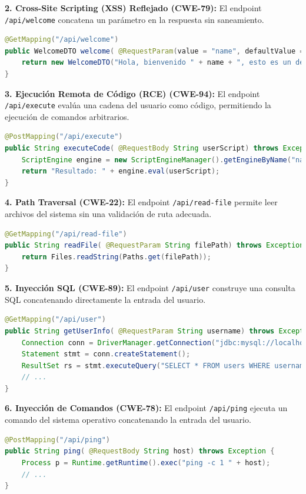 \textbf{2. Cross-Site Scripting (XSS) Reflejado (CWE-79):} El endpoint \texttt{/api/welcome} concatena un parámetro en la respuesta sin saneamiento.
\begin{lstlisting}[language=java, caption={Código vulnerable a XSS.}]
@GetMapping("/api/welcome")
public WelcomeDTO welcome( @RequestParam(value = "name", defaultValue = "...") String name) {
    return new WelcomeDTO("Hola, bienvenido " + name + ", esto es un demo");
}
\end{lstlisting}

\textbf{3. Ejecución Remota de Código (RCE) (CWE-94):} El endpoint \texttt{/api/execute} evalúa una cadena del usuario como código, permitiendo la ejecución de comandos arbitrarios.
\begin{lstlisting}[language=java, caption={Código vulnerable a RCE.}]
@PostMapping("/api/execute")
public String executeCode( @RequestBody String userScript) throws Exception {
    ScriptEngine engine = new ScriptEngineManager().getEngineByName("nashorn");
    return "Resultado: " + engine.eval(userScript);
}
\end{lstlisting}

\textbf{4. Path Traversal (CWE-22):} El endpoint \texttt{/api/read-file} permite leer archivos del sistema sin una validación de ruta adecuada.
\begin{lstlisting}[language=java, caption={Código vulnerable a Path Traversal.}]
@GetMapping("/api/read-file")
public String readFile( @RequestParam String filePath) throws Exception {
    return Files.readString(Paths.get(filePath));
}
\end{lstlisting}

\textbf{5. Inyección SQL (CWE-89):} El endpoint \texttt{/api/user} construye una consulta SQL concatenando directamente la entrada del usuario.
\begin{lstlisting}[language=java, caption={Código vulnerable a Inyección SQL.}]
@GetMapping("/api/user")
public String getUserInfo( @RequestParam String username) throws Exception {
    Connection conn = DriverManager.getConnection("jdbc:mysql://localhost:3306/demo", "root", DB_PASSWORD);
    Statement stmt = conn.createStatement();
    ResultSet rs = stmt.executeQuery("SELECT * FROM users WHERE username = '" + username + "'");
    // ...
}
\end{lstlisting}

\textbf{6. Inyección de Comandos (CWE-78):} El endpoint \texttt{/api/ping} ejecuta un comando del sistema operativo concatenando la entrada del usuario.
\begin{lstlisting}[language=java, caption={Código vulnerable a Inyección de Comandos.}]
@PostMapping("/api/ping")
public String ping( @RequestBody String host) throws Exception {
    Process p = Runtime.getRuntime().exec("ping -c 1 " + host);
    // ...
}
\end{lstlisting}

